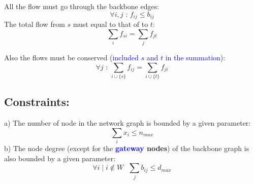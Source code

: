 \documentclass[letterpaper, 12pt]{article}
\newcommand{\blue}[1]{\textcolor{blue}{#1}}
\begin{document}
All the flow must go through the backbone edges:
\begin{equation}
	\forall i,j \mbox{ : }f_{ij} \leq b_{ij}
\end{equation}
The total flow from $s$ must equal to that of to $t$:
\begin{equation}
	\sum_i f_{si} = \sum_j f_{jt}
\end{equation} 

Also the flows must be conserved (\blue{included $s$ and $t$ in the summation}):
\begin{equation}
	\forall j \mbox{ : } \sum_{i \cup \{s\}} f_{ij} = \sum_{i \cup \{t\}} f_{ji}
\end{equation}
\subsection*{Constraints:} a) The number of node in the network graph is bounded
by a given parameter:
\begin{equation}
	\sum_i x_i \leq n_{max}
\end{equation}
b) The node degree (except for the \textbf{\blue{gateway} nodes}) of the backbone graph is
also bounded by a given parameter:
\begin{equation}
	\forall i \mid i \notin W \mbox{ } \sum_j b_{ij}  \leq d_{max}
\end{equation}
\end{document}
